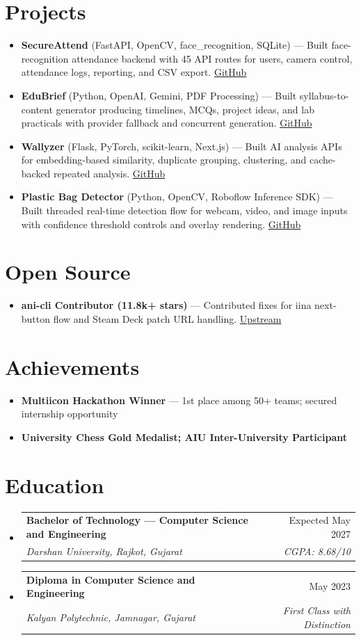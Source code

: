 \documentclass[11pt,a4paper]{article}
\makeatletter
\newcommand{\resumeSubheading}[4]{
  \vspace{-1pt}\item
    \begin{tabular*}{0.97\textwidth}[t]{l@{\extracolsep{\fill}}r}
      \textbf{#1} & #2 \\
      \textit{#3} & \textit{#4} \\
    \end{tabular*}\vspace{-3pt}
}
\newcommand{\resumeItem}[1]{
  \item\small{#1 \vspace{-1pt}}
}
\makeatother
\begin{document}
\section{Projects}
\begin{itemize}[leftmargin=*]
  \resumeItem{\textbf{SecureAttend} (FastAPI, OpenCV, face\_recognition, SQLite) --- Built face-recognition attendance backend with 45 API routes for users, camera control, attendance logs, reporting, and CSV export. \href{https://github.com/Dhairya3391/SecureAttend}{GitHub}}
  \resumeItem{\textbf{EduBrief} (Python, OpenAI, Gemini, PDF Processing) --- Built syllabus-to-content generator producing timelines, MCQs, project ideas, and lab practicals with provider fallback and concurrent generation. \href{https://github.com/Dhairya3391/EduBrief}{GitHub}}
  \resumeItem{\textbf{Wallyzer} (Flask, PyTorch, scikit-learn, Next.js) --- Built AI analysis APIs for embedding-based similarity, duplicate grouping, clustering, and cache-backed repeated analysis. \href{https://github.com/Dhairya3391/wallyzer}{GitHub}}
  \resumeItem{\textbf{Plastic Bag Detector} (Python, OpenCV, Roboflow Inference SDK) --- Built threaded real-time detection flow for webcam, video, and image inputs with confidence threshold controls and overlay rendering. \href{https://github.com/Dhairya3391/plastic-detector}{GitHub}}
\end{itemize}

\section{Open Source}
\begin{itemize}[leftmargin=*]
  \resumeItem{\textbf{ani-cli Contributor (11.8k+ stars)} --- Contributed fixes for iina next-button flow and Steam Deck patch URL handling. \href{https://github.com/pystardust/ani-cli}{Upstream}}
\end{itemize}

\section{Achievements}
\begin{itemize}[leftmargin=*]
  \resumeItem{\textbf{Multiicon Hackathon Winner} --- 1st place among 50+ teams; secured internship opportunity}
  \resumeItem{\textbf{University Chess Gold Medalist; AIU Inter-University Participant}}
\end{itemize}

\section{Education}
\begin{itemize}[leftmargin=*]
\resumeSubheading
{Bachelor of Technology --- Computer Science and Engineering}{Expected May 2027}
{Darshan University, Rajkot, Gujarat}{CGPA: 8.68/10}
\resumeSubheading
{Diploma in Computer Science and Engineering}{May 2023}
{Kalyan Polytechnic, Jamnagar, Gujarat}{First Class with Distinction}
\end{itemize}
\end{document}
